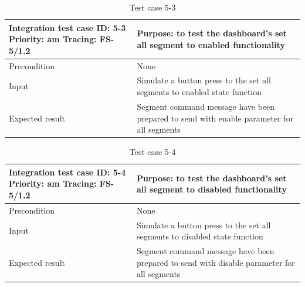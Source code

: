 \begin{table}[H]
	\caption{Test case 5-3}
	\label{table:TCase-FS5-3}
	\begin{center}
		\renewcommand{\arraystretch}{1.8}
		\begin{tabu} 
			to 0.9 \textwidth
			{  X[0.4, c] X[c] }
			\toprule
			Integration test case ID: 5-3 \newline Priority: am \newline Tracing: FS-5/1.2 & Purpose: to test the dashboard's set all segment to enabled functionality                 \\ \midrule
			Precondition                                                                   & None                                                                                      \\
			Input                                                                          & Simulate a button press to the set all segments to enabled state function                 \\
			Expected result                                                                & Segment command message have been prepared to send with enable parameter for all segments \\ \bottomrule
		\end{tabu}
	\end{center}
\end{table}

\begin{table}[H]
	\caption{Test case 5-4}
	\label{table:TCase-FS5-4}
	\begin{center}
		\renewcommand{\arraystretch}{1.8}
		\begin{tabu} 
			to 0.9 \textwidth
			{  X[0.4, c] X[c] }
			\toprule
			Integration test case ID: 5-4 \newline Priority: am \newline Tracing: FS-5/1.2 & Purpose: to test the dashboard's set all segment to disabled functionality                 \\ \midrule
			Precondition                                                                   & None                                                                                       \\
			Input                                                                          & Simulate a button press to the set all segments to disabled state function                 \\
			Expected result                                                                & Segment command message have been prepared to send with disable parameter for all segments \\ \bottomrule
		\end{tabu}
	\end{center}
\end{table}


